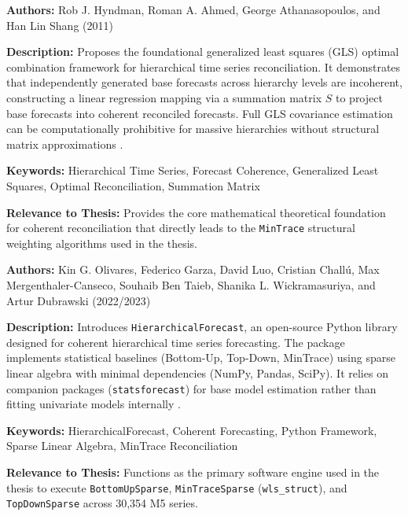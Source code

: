 {

	\textbf{Authors:}
	Rob J. Hyndman, Roman A. Ahmed, George Athanasopoulos, and Han Lin Shang (2011)

	\textbf{Description:}
	Proposes the foundational generalized least squares (GLS) optimal combination framework for hierarchical time series reconciliation. It demonstrates that independently generated base forecasts across hierarchy levels are incoherent, constructing a linear regression mapping via a summation matrix \(S\) to project base forecasts into coherent reconciled forecasts. Full GLS covariance estimation can be computationally prohibitive for massive hierarchies without structural matrix approximations \autocite{Hyndman:2011}.

	\textbf{Keywords:}
	Hierarchical Time Series, Forecast Coherence, Generalized Least Squares, Optimal Reconciliation, Summation Matrix

	\textbf{Relevance to Thesis:}
	Provides the core mathematical theoretical foundation for coherent reconciliation that directly leads to the \texttt{MinTrace} structural weighting algorithms used in the thesis.

}

{

	\textbf{Authors:}
	Kin G. Olivares, Federico Garza, David Luo, Cristian Chall\'u, Max Mergenthaler-Canseco, Souhaib Ben Taieb, Shanika L. Wickramasuriya, and Artur Dubrawski (2022/2023)

	\textbf{Description:}
	Introduces \texttt{HierarchicalForecast}, an open-source Python library designed for coherent hierarchical time series forecasting. The package implements statistical baselines (Bottom-Up, Top-Down, MinTrace) using sparse linear algebra with minimal dependencies (NumPy, Pandas, SciPy). It relies on companion packages (\texttt{statsforecast}) for base model estimation rather than fitting univariate models internally \autocite{Olivares:2023}.

	\textbf{Keywords:}
	HierarchicalForecast, Coherent Forecasting, Python Framework, Sparse Linear Algebra, MinTrace Reconciliation

	\textbf{Relevance to Thesis:}
	Functions as the primary software engine used in the thesis to execute \texttt{BottomUpSparse}, \texttt{MinTraceSparse} (\texttt{wls\_struct}), and \texttt{TopDownSparse} across 30,354 M5 series.

}

